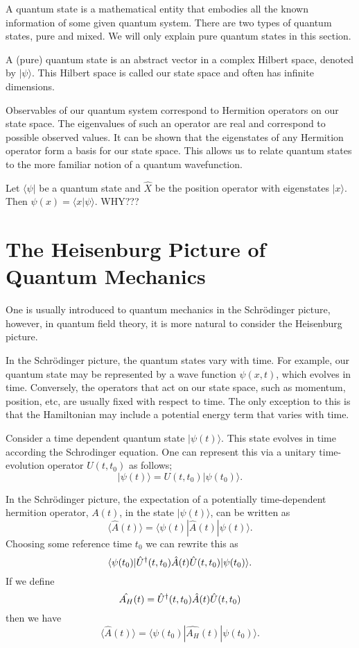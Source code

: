 \documentclass[11pt, a4paper]{article}
\theoremstyle{definition}
\theoremstyle{plain}
\begin{document}
A quantum state is a mathematical entity that embodies all 
the known information of some given quantum system. There 
are two types of quantum states, pure and mixed. We will 
only explain pure quantum states in this section.

A (pure) quantum state is an abstract vector in a complex 
Hilbert space, denoted by $| \psi \rangle $. This Hilbert 
space is called our state space and often has infinite 
dimensions.

Observables of our quantum system correspond to Hermition 
operators on our state space. The eigenvalues of such an 
operator are real and correspond to possible observed 
values. It can be shown that the eigenstates of any 
Hermition operator form a basis for our state space. This 
allows us to relate quantum states to the more familiar 
notion of a quantum wavefunction.

Let $\langle \psi |$ be a quantum state and $\hat{X}$ be the position operator with eigenstates $|x \rangle$. Then $\psi (x) = \langle x | \psi \rangle$. WHY???


\section{The Heisenburg Picture of Quantum Mechanics}

One is usually introduced to quantum mechanics in the 
Schrödinger picture, however, in quantum field theory, 
it is more natural to consider the Heisenburg picture.

In the Schrödinger picture, the quantum states vary with 
time. For example, our quantum state may be represented 
by a wave function $\psi(x,t)$, which evolves in time. 
Conversely,
the operators that act on our state space, such as 
momentum, position, etc, are usually fixed with respect to time. 
The only exception to this is that the Hamiltonian may include 
a potential energy term that varies with time. 

Consider a time dependent quantum state 
$| \psi(t) \rangle$. This state evolves in time 
according the  Schrodinger equation. One can 
represent this via a unitary time-evolution operator 
$U(t,t_0)$ 
as follows;
\[ | \psi(t) \rangle = U(t,t_0) | \psi(t_0) \rangle .\]

In the Schrödinger 
picture, the expectation of a potentially time-dependent hermition operator, $A(t)$, in the 
state $| \psi(t) \rangle$,  can be written as 
\[\langle \hat{A}(t) \rangle = \langle \psi(t) | \hat{A}(t) | \psi(t) \rangle.\]
Choosing some reference time $t_0$ we can rewrite this as
\[\langle \psi(t_0) | \hat{U}\textsuperscript{\textdagger}(t,t_0) \hat{A}  (t) \hat{U}(t,t_0) | \psi(t_0) \rangle.\]
If we define 
\[\hat{A_H}(t) = \hat{U}\textsuperscript{\textdagger}(t,t_0) \hat{A}  (t) \hat{U}(t,t_0) \]
then we have 
\[\langle \hat{A}(t) \rangle = \langle \psi(t_0) | \hat{A_H}(t) | \psi(t_0) \rangle.\]
\end{document}

